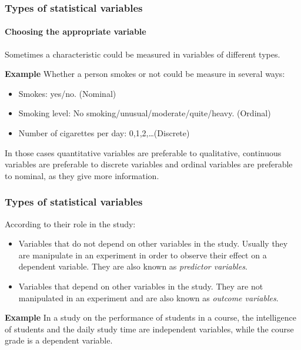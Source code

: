 \begin{frame}
\frametitle{Types of statistical variables}
\framesubtitle{Choosing the appropriate variable}
Sometimes a characteristic could be measured in variables of different types.

\textbf{Example} Whether a person smokes or not could be measure in several ways:
\begin{itemize}
\item Smokes: yes/no. (Nominal)
\item Smoking level: No smoking/unusual/moderate/quite/heavy. (Ordinal)
\item Number of cigarettes per day: 0,1,2,\ldots (Discrete)
\end{itemize}

In those cases quantitative variables are preferable to qualitative, continuous variables are preferable to discrete
variables and ordinal variables are preferable to nominal, as they give more information.

\begin{center}
\scalebox{1}{}
\end{center}
\end{frame}


\begin{frame}
\frametitle{Types of statistical variables}
According to their role in the study:
\begin{itemize}
\item {} Variables that do not depend on other variables in the study.
Usually they are manipulate in an experiment in order to observe their effect on a dependent variable.
They are also known as \emph{predictor variables}.
\item {} Variables that depend on other variables in the study.
They are not manipulated in an experiment and are also known as \emph{outcome variables}.
\end{itemize}

\textbf{Example} In a study on the performance of students in a course, the intelligence of students and the daily
study time are independent variables, while the course grade is a dependent variable.
\end{frame}


